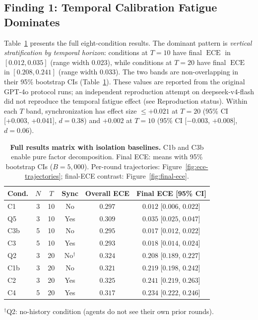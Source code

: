 \documentclass[11pt]{article}
\DeclareMathOperator{\ECE}{ECE}
\begin{document}
\subsection{Finding 1: Temporal Calibration Fatigue Dominates}

Table~\ref{tab:results} presents the full eight-condition results. The dominant pattern is \textit{vertical stratification by temporal horizon}: conditions at $T{=}10$ have final $\ECE$ in $[0.012, 0.035]$ (range width $0.023$), while conditions at $T{=}20$ have final $\ECE$ in $[0.208, 0.241]$ (range width $0.033$). The two bands are non-overlapping in their 95\% bootstrap CIs (Table~\ref{tab:results}). These values are reported from the original GPT-4o protocol runs; an independent reproduction attempt on deepseek-v4-flash did not reproduce the temporal fatigue effect (see Reproduction status). Within each $T$ band, synchronization has effect size $\leq +0.021$ at $T{=}20$ (95\% CI [+0.003, +0.041], $d = 0.38$) and $+0.002$ at $T{=}10$ (95\% CI [$-0.003$, $+0.008$], $d = 0.06$).

\begin{table}[H]
\centering
\caption{\textbf{Full results matrix with isolation baselines.} C1b and C3b enable pure factor decomposition. Final ECE: means with 95\% bootstrap CIs ($B{=}5{,}000$). Per-round trajectories: Figure~\ref{fig:ece-trajectories}; final-ECE contrast: Figure~\ref{fig:final-ece}.}
\label{tab:results}
\begin{tabular}{@{}lccccc@{}}
\toprule
Cond. & $N$ & $T$ & Sync & Overall ECE & Final ECE [95\% CI] \\
\midrule
C1  & 3 & 10 & No  & $0.297$ & $0.012$ [$0.006$, $0.022$] \\
Q5  & 3 & 10 & Yes & $0.309$ & $0.035$ [$0.025$, $0.047$] \\
C3b & 5 & 10 & No  & $0.295$ & $0.017$ [$0.012$, $0.022$] \\
C3  & 5 & 10 & Yes & $0.293$ & $0.018$ [$0.014$, $0.024$] \\
\midrule
Q2  & 3 & 20 & No$^\dagger$ & $0.324$ & $0.208$ [$0.189$, $0.227$] \\
C1b & 3 & 20 & No  & $0.321$ & $0.219$ [$0.198$, $0.242$] \\
C2  & 3 & 20 & Yes & $0.325$ & $0.241$ [$0.219$, $0.263$] \\
C4  & 5 & 20 & Yes & $0.317$ & $0.234$ [$0.222$, $0.246$] \\
\bottomrule
\end{tabular}
\smallskip
{\footnotesize $^\dagger$Q2: no-history condition (agents do not see their own prior rounds).}
\end{table}
\end{document}
